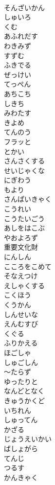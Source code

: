 \documentclass[8pt]{extreport}
\begin{document}
\begin{CJK}{UTF8}{min}
\\	そんざいかん
\\	しゅいろ
\\	くむ
\\	あふれだす
\\	わきみず
\\	すずむ
\\	ふきでる
\\	ぜっけい
\\	てっぺん
\\	あちこち
\\	しきち
\\	みわたす
\\	きよめ
\\	てんのう
\\	フラッと
\\	とかい
\\	さんさくする
\\	せいじゃくな
\\	にぎわう
\\	もより
\\	さんぱいきゃく
\\	こうれい
\\	こうたいごう
\\	あしをはこぶ
\\	やおよろず
\\	重要文化財
\\	にんしん
\\	こころをこめて
\\	そなえつけ
\\	えしゃくする
\\	こくほう
\\	くうかん
\\	しんせいな
\\	えんむすび
\\	くぐる
\\	ふりかえる
\\	ほごしゃ
\\	しゅごしん
\\	～たらず
\\	ゆったりと
\\	なんどとなく
\\	きゅうかくど
\\	いちれん
\\	しゅってん
\\	かざる
\\	じょうえいかい
\\	ばしょがら
\\	てんじ
\\	つるす
\\	かんきゃく

\end{CJK}
\end{document}
